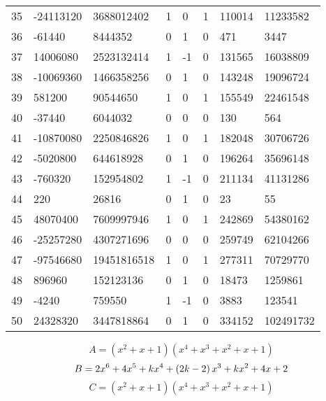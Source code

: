 \documentclass{amsart}
\begin{document}
\begin{longtable}{|l|l|l|lllll|}
35&-24113120&3688012402&1&0&1&110014&11233582\\
36&-61440&8444352&0&1&0&471&3447\\
37&14006080&2523132414&1&-1&0&131565&16038809\\
38&-10069360&1466358256&0&1&0&143248&19096724\\
39&581200&90544650&1&0&1&155549&22461548\\
40&-37440&6044032&0&0&0&130&564\\
41&-10870080&2250846826&1&0&1&182048&30706726\\
42&-5020800&644618928&0&1&0&196264&35696148\\
43&-760320&152954802&1&-1&0&211134&41131286\\
44&220&26816&0&1&0&23&55\\
45&48070400&7609997946&1&0&1&242869&54380162\\
46&-25257280&4307271696&0&0&0&259749&62104266\\
47&-97546680&19451816518&1&0&1&277311&70729770\\
48&896960&152123136&0&1&0&18473&1259861\\
49&-4240&759550&1&-1&0&3883&123541\\
50&24328320&3447818864&0&1&0&334152&102491732\\
\hline
\end{longtable}
$$A=(x^2
 + x
 + 1)(x^4
 + x^3
 + x^2
 + x
 + 1)$$
$$B=2\*x^6
 + 4\*x^5
 + k\*x^4
 + \left(2\*k
 - 2\right) \*x^3
 + k\*x^2
 + 4\*x
 + 2$$
$$C=(x^2
 + x
 + 1)(x^4
 + x^3
 + x^2
 + x
 + 1)$$
\end{document}
